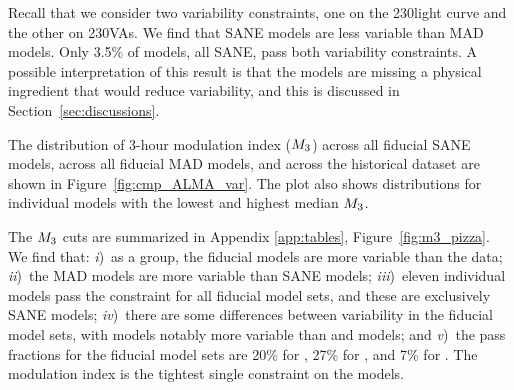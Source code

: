 Recall that we consider two variability constraints, one on the 230\GHz light curve and the other on 230\GHz VAs.  We find that SANE models are less variable than MAD models. Only 3.5\% of models, all SANE, pass both variability constraints.  A possible interpretation of this result is that the models are missing a physical ingredient that would reduce variability, and this is discussed in Section~\ref{sec:discussions}.


The distribution of 3-hour modulation index ($M_{3}$) across all fiducial SANE models, across all fiducial MAD models, and across the historical dataset are shown in Figure~\ref{fig:cmp_ALMA_var}.
The plot also shows distributions for individual models with the lowest and highest median $M_{3}$.

The $M_{3}$ cuts are summarized in Appendix \ref{app:tables}, Figure~\ref{fig:m3_pizza}.
We find that:
\emph{i})~as a group, the fiducial models are more variable than the data;
\emph{ii})~the MAD models are more variable than SANE models;
\emph{iii})~eleven individual models  pass the constraint for all fiducial model sets, and these are exclusively SANE models;
\emph{iv})~there are some differences between variability in the fiducial model sets, with \hamr models notably more variable than \kharma and \bhac models; and
\emph{v})~the pass fractions for the fiducial model sets are 20\% for \kharma, 27\% for \bhac, and 7\% for \hamr.
The modulation index is the tightest single constraint on the models.


